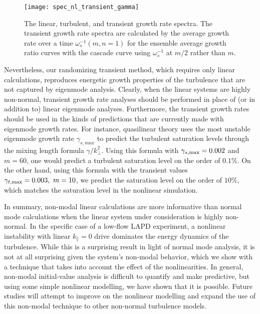 \documentclass[letter,scriptaddress,twocolumn, prl,showkeys]{revtex4}
\def\para{\parallel}
\begin{document}
\begin{figure}
\centerline{\texttt{[image: spec\_nl\_transient\_gamma]}}
\caption{The linear, turbulent, and transient growth rate spectra. The transient growth rate spectra are calculated by the average growth rate over a time $\omega_s^{-1}(m,n=1)$ for the ensemble average
growth ratio curves with the cascade curve using $\omega_s^{-1}$ at $m/2$ rather than $m$.}
\label{spec_nl_transient_gamma}
\end{figure}

Nevertheless, our randomizing transient method, which requires only linear calculations, reproduces energetic growth properties of the turbulence that are not captured by eigenmode analysis.
Clearly, when the linear systems are highly non-normal, transient growth rate analyses should be performed in place of (or in addition to) linear eigenmode analyses. 
Furthermore, the transient growth rates should be used in the kinds of predictions that are currently made with eigenmode growth rates. 
For instance, quasilinear theory uses the most unstable eigenmode growth rate $\gamma_{s,max}$ to predict the turbulent saturation levels through the mixing length formula $\gamma/k_\perp^2$. 
Using this formula with $\gamma_{s,\rm{max}} = 0.002$ and $m=60$, one would predict a turbulent saturation level on the order of $0.1 \%$. 
On the other hand, using this formula with the transient values $\gamma_{t,\rm{max}} = 0.003, \ m=10$, we predict the saturation level on the order of $10 \%$,
which matches the saturation level in the nonlinear simulation.

In summary, non-modal linear calculations are more informative than normal mode calculations when the linear system under consideration is highly non-normal. In the specific case of a low-flow
LAPD experiment, a nonlinear instability with linear $k_\para=0$ drive dominates the energy dynamics of the turbulence. While this is a surprising result in light of normal mode analysis,
it is not at all surprising given the system's non-modal behavior, which we show with a technique that takes into account the effect of the nonlinearities. 
In general, non-modal initial-value analysis is difficult to quantify and make predictive, but using some simple nonlinear modelling, we have shown that it is possible. Future studies will
attempt to improve on the nonlinear modelling and expand the use of this non-modal technique to other non-normal turbulence models.

\begin{acknowledgments}

\end{acknowledgments}



%

\end{document}
